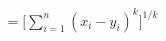 \documentclass[preview]{standalone}
\begin{document}
\begin{align*}
= \Biggl\lbrack \sum_{i=1}^{n} (x_{i}-y_{i})^{k} \Biggr\rbrack ^{1/k}
\end{align*}
\end{document}
